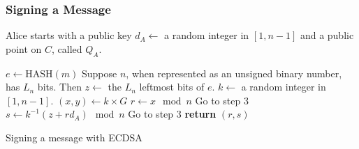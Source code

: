 \subsubsection{Signing a Message}

Alice starts with a public key $d_A \gets$ a random integer in $[1, n-1]$
and a public point on $C$, called $Q_A$.

\begin{algorithm}
    \begin{algorithmic}
        \State $e \gets \text{HASH}(m)$
        \State Suppose $n$, when represented as an unsigned binary number, has $L_n$ bits.
        Then $z \gets$ the $L_n$ leftmost bits of $e$.
        \State $k \gets$ a random integer in $[1, n-1]$.
        \State $(x,y) \gets k \times G$
        \State $r \gets x \mod n$
        \State Go to step 3
        \EndIf
        \State $s \gets k^{-1}(z + rd_A) \mod n$
        \State Go to step 3
        \EndIf
        \State \textbf{return} $(r, s)$
        \EndProcedure
    \end{algorithmic}
    \caption{Signing a message with ECDSA}
\end{algorithm}




